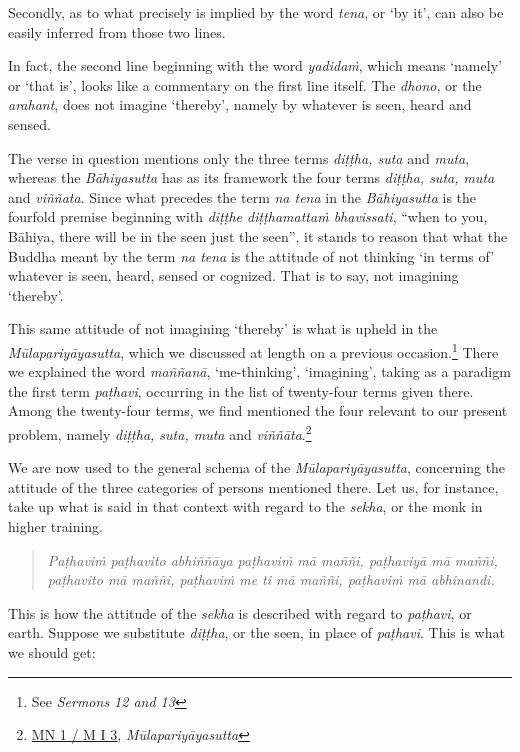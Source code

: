Secondly, as to what precisely is implied by the word \emph{tena}, or `by it', can also be easily inferred from those two lines.

In fact, the second line beginning with the word \emph{yadidaṁ}, which means `namely' or `that is', looks like a commentary on the first line itself. The \emph{dhono}, or the \emph{arahant}, does not imagine `thereby', namely by whatever is seen, heard and sensed.

The verse in question mentions only the three terms \emph{diṭṭha, suta} and \emph{muta}, whereas the \emph{Bāhiyasutta} has as its framework the four terms \emph{diṭṭha, suta, muta} and \emph{viññata}. Since what precedes the term \emph{na tena} in the \emph{Bāhiyasutta} is the fourfold premise beginning with \emph{diṭṭhe diṭṭhamattaṁ bhavissati}, ``when to you, Bāhiya, there will be in the seen just the seen'', it stands to reason that what the Buddha meant by the term \emph{na tena} is the attitude of not thinking `in terms of' whatever is seen, heard, sensed or cognized. That is to say, not imagining `thereby'.

This same attitude of not imagining `thereby' is what is upheld in the \emph{Mūlapariyāyasutta}, which we discussed at length on a previous occasion.\footnote{See \emph{Sermons 12 and 13}} There we explained the word \emph{maññanā}, `me-thinking', `imagining', taking as a paradigm the first term \emph{paṭhavi}, occurring in the list of twenty-four terms given there. Among the twenty-four terms, we find mentioned the four relevant to our present problem, namely \emph{diṭṭha, suta, muta} and \emph{viññāta}.\footnote{\href{https://suttacentral.net/mn1/pli/ms}{MN 1 / M I 3}, \emph{Mūlapariyāyasutta}}

We are now used to the general schema of the \emph{Mūlapariyāyasutta}, concerning the attitude of the three categories of persons mentioned there. Let us, for instance, take up what is said in that context with regard to the \emph{sekha}, or the monk in higher training.

\begin{quote}
\emph{Paṭhaviṁ paṭhavito abhiññāya paṭhaviṁ mā maññi, paṭhaviyā mā maññi, paṭhavito mā maññi, paṭhaviṁ me ti mā maññi, paṭhaviṁ mā abhinandi.}
\end{quote}

This is how the attitude of the \emph{sekha} is described with regard to \emph{paṭhavi}, or earth. Suppose we substitute \emph{diṭṭha}, or the seen, in place of \emph{paṭhavi}. This is what we should get:

